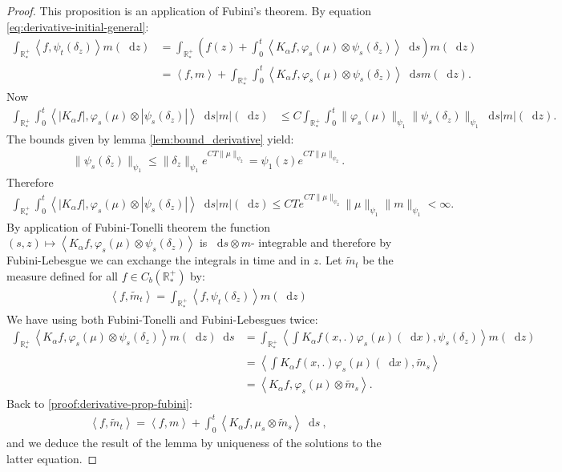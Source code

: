 \documentclass[11pt,a4paper]{article}
\newcommand{\RRP}{\mathbb{R}^+_*}
\newcommand{\brac}[1]{\left\langle#1\right\rangle}
\newcommand{\dd}{\mathop{}\!\mathrm{d}}
\begin{document}
\begin{proof}
    This proposition is an application of Fubini's theorem. By equation \eqref{eq:derivative-initial-general}:
    \begin{align}
        \int_{\RRP} \brac{f,\psi_t\left(\delta_z\right)}m(\dd z) &= \int_{\RRP}\left( f(z) + \int_0^t \brac{K_\alpha f,\varphi_s(\mu)\otimes\psi_s\left(\delta_z\right)} \dd s \right)m(\dd z) \nonumber\\
        &= \brac{f,m} + \int_{\RRP}\int_0^t \brac{K_\alpha f,\varphi_s(\mu)\otimes\psi_s\left(\delta_z\right)} \dd sm(\dd z).\label{proof:derivative-prop-fubini}
    \end{align}
    Now 
    \begin{align*}
        \int_{\RRP}\int_0^t \brac{ |K_\alpha f|,\varphi_s(\mu)\otimes|\psi_s\left(\delta_z\right)|} \dd s |m|(\dd z) 
        &\leq C\int_{\RRP}\int_0^t\|\varphi_s(\mu)\|_{\psi_1}  \|\psi_s(\delta_z)\|_{\psi_1}\dd s |m|(\dd z).
    \end{align*}
    The bounds given by lemma \ref{lem:bound_derivative} yield: 
    \begin{align*}
        \|\psi_s(\delta_z)\|_{\psi_1} \leq \|\delta_z\|_{\psi_1}e^{CT\|\mu\|_{\psi_2}} = \psi_1(z)e^{CT\|\mu\|_{\psi_2}}.
    \end{align*}
    Therefore
    \begin{align*}
        \int_{\RRP}\int_0^t \brac{ |K_\alpha f|,\varphi_s(\mu)\otimes|\psi_s\left(\delta_z\right)|} \dd s |m|(\dd z)  \leq CT e^{CT\|\mu\|_{\psi_2}}\|\mu\|_{\psi_1}\|m\|_{\psi_1} < \infty.
    \end{align*}
    By application of Fubini-Tonelli theorem the function $(s,z) \mapsto \brac{ K_\alpha f,\varphi_s(\mu)\otimes\psi_s\left(\delta_z\right)}$ is $\dd s \otimes m$- integrable and therefore by Fubini-Lebesgue we can exchange the integrals in time and in $z$. Let $\tilde{m}_t$ be the measure defined for all $f \in C_b(\RRP)$ by:
    \begin{align*}
        \brac{f,\tilde{m}_t} = \int_{\RRP} \brac{f,\psi_t\left(\delta_z\right)}m(\dd z)
    \end{align*}
    We have using both Fubini-Tonelli and Fubini-Lebesgues twice:
    \begin{align*}
        \int_{\RRP} \brac{K_\alpha f,\varphi_s(\mu)\otimes\psi_s\left(\delta_z\right)} m(\dd z) \dd s 
        &= \int_{\RRP} \brac{\int K_\alpha f(x,.)\varphi_s(\mu)(\dd x), \psi_s(\delta_z)} m(\dd z) \\
        &= \brac{\int K_\alpha f(x,.)\varphi_s(\mu)(\dd x),\tilde{m}_s} \\
        &= \brac{K_\alpha f, \varphi_s(\mu) \otimes \tilde{m}_s}.
    \end{align*}
    Back to \eqref{proof:derivative-prop-fubini}:
    \begin{align*}
        \brac{f,\tilde{m}_t} = \brac{f,m} + \int_0^t \brac{K_\alpha f, \mu_s \otimes \tilde{m}_s} \dd s\ ,
    \end{align*}
    and we deduce the result of the lemma by uniqueness of the solutions to the latter equation.
\end{proof}
\end{document}
